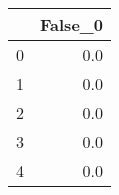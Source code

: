 \begin{tabular}{lr}
\toprule
{} &  False\_0 \\ \hline
\midrule
0 &      0.0 \\ \hline
1 &      0.0 \\ \hline
2 &      0.0 \\ \hline
3 &      0.0 \\ \hline
4 &      0.0 \\ \hline
\bottomrule
\end{tabular}
